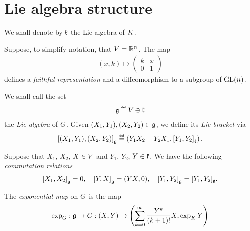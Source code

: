 \section{Lie algebra structure}

We shall denote by $\LieAlgebraCompactGroup$ the Lie algebra of $\CompactGroup$.

Suppose, to simplify notation, that $V = \R^n$.
The map
\begin{align*}
    (x, k) \mapsto
        \begin{pmatrix}
            k & x\\
            0 & 1
        \end{pmatrix}
\end{align*}
defines a \emph{faithful representation}
and a diffeomorphism to a subgroup of $\GeneralLinear n$.

\begin{definition}
    We shall call the set
    \begin{align*}
        \LieAlgebra \defeq
        \VectorSpace \oplus \LieAlgebraCompactGroup
    \end{align*}
    the \emph{Lie algebra} of $\Group$.  
    Given $(X_1, Y_1), (X_2, Y_2) \in \LieAlgebra$,
    we define its \emph{Lie bracket} via
    \begin{align*}
        \LieBracket{(X_1, Y_1)}{(X_2, Y_2)}
        \defeq \left(Y_1 X_2 - Y_2 X_1, \LieBracket[\LieAlgebraCompactGroup]{Y_1}{Y_2}\right).
    \end{align*}
\end{definition}

\begin{lemma}
    Suppose that $X_1$, $X_2$, $X \in \VectorSpace$ and $Y_1$, $Y_2$, $Y \in \LieAlgebraCompactGroup$.
    We have the following \emph{commutation relations}
    \begin{align*}
        \LieBracket{X_1}{X_2} = 0,\quad
        \LieBracket{Y}{X} = (Y X, 0),\quad
        \LieBracket{Y_1}{Y_2} = \LieBracket[\LieAlgebraCompactGroup]{Y_1}{Y_2}.
    \end{align*}
\end{lemma}

\begin{definition}
\label{definition:exponential_map}
    The \emph{exponential map} on $\Group$ is the map
    \begin{align*}
        \exp_\Group : \LieAlgebra \to \Group : (X, Y) \mapsto \left(\sum_{k = 0}^\infty \frac{Y^k}{{(k + 1)}!} X, \exp_\CompactGroup Y\right)
    \end{align*}
\end{definition}

